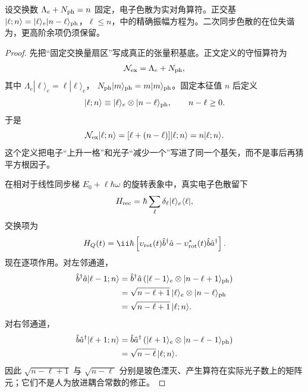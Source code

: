 \begin{proposition}[交换守恒扇区中的反冲格]
设交换数 $\Lambda_e+N_{\rm ph}=n$ 固定，电子色散为实对角算符。正交基 $|\ell;n\rangle=|\ell\rangle_e|n-\ell\rangle_{\rm ph}$，$\ell\le n$，中的精确振幅方程为。二次同步色散的在位失谐为，更高阶余项仍须保留。
\end{proposition}
\begin{proof}
先把“固定交换量扇区”写成真正的张量积基底。正文定义的守恒算符为
\begin{equation*}
\mathcal N_{\rm ex}=\Lambda_e+N_{\rm ph},
\end{equation*}
其中 \(\Lambda_e|\ell\rangle_e=\ell|\ell\rangle_e\)，
\(N_{\rm ph}|m\rangle_{\rm ph}=m|m\rangle_{\rm ph}\)。固定本征值 \(n\) 后定义
\begin{equation*}
|\ell;n\rangle
\equiv
|\ell\rangle_e\otimes|n-\ell\rangle_{\rm ph},
\qquad n-\ell\ge0.
\end{equation*}
于是
\begin{equation*}
\mathcal N_{\rm ex}|\ell;n\rangle
=[\ell+(n-\ell)]|\ell;n\rangle
=n|\ell;n\rangle.
\end{equation*}
这个定义把电子“上升一格”和光子“减少一个”写进了同一个基矢，而不是事后再猜平方根因子。

在相对于线性同步梯 \(E_0+\ell\hbar\omega\) 的旋转表象中，真实电子色散留下
\begin{equation*}
H_{\rm rec}
=\hbar\sum_\ell\delta_\ell|\ell\rangle_e\langle\ell|,
\end{equation*}
交换项为
\begin{equation*}
H_Q(t)
=\ii\hbar\left[
\upsilon_{\rm rot}(t)\hat b^\dagger\hat a
-\upsilon_{\rm rot}^*(t)\hat b\hat a^\dagger
\right].
\end{equation*}
现在逐项作用。对左邻通道，
\begin{align*}
\hat b^\dagger\hat a|\ell-1;n\rangle
&=\hat b^\dagger\hat a
\left(|\ell-1\rangle_e\otimes|n-\ell+1\rangle_{\rm ph}\right)\\
&=\sqrt{n-\ell+1}\,
|\ell\rangle_e\otimes|n-\ell\rangle_{\rm ph}\\
&=\sqrt{n-\ell+1}\,|\ell;n\rangle.
\end{align*}
对右邻通道，
\begin{align*}
\hat b\hat a^\dagger|\ell+1;n\rangle
&=\hat b\hat a^\dagger
\left(|\ell+1\rangle_e\otimes|n-\ell-1\rangle_{\rm ph}\right)\\
&=\sqrt{n-\ell}\,|\ell;n\rangle.
\end{align*}
因此 \(\sqrt{n-\ell+1}\) 与 \(\sqrt{n-\ell}\) 分别是玻色湮灭、产生算符在实际光子数上的矩阵元；它们不是人为放进耦合常数的修正。


\end{proof}
